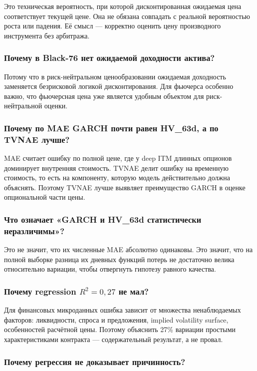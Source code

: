 \documentclass[11pt,a4paper]{article}
\begin{document}
Это техническая вероятность, при которой дисконтированная ожидаемая цена соответствует текущей цене. Она не обязана совпадать с реальной вероятностью роста или падения. Её смысл --- корректно оценить цену производного инструмента без арбитража.

\subsubsection{Почему в Black-76 нет ожидаемой доходности актива?}

Потому что в риск-нейтральном ценообразовании ожидаемая доходность заменяется безрисковой логикой дисконтирования. Для фьючерса особенно важно, что фьючерсная цена уже является удобным объектом для риск-нейтральной оценки.

\subsubsection{Почему по MAE GARCH почти равен HV\_63d, а по TVNAE лучше?}

MAE считает ошибку по полной цене, где у deep ITM длинных опционов доминирует внутренняя стоимость. TVNAE делит ошибку на временную стоимость, то есть на компоненту, которую модель действительно должна объяснять. Поэтому TVNAE лучше выявляет преимущество GARCH в оценке опциональной части цены.

\subsubsection{Что означает «GARCH и HV\_63d статистически неразличимы»?}

Это не значит, что их численные MAE абсолютно одинаковы. Это значит, что на полной выборке разница их дневных функций потерь не достаточно велика относительно вариации, чтобы отвергнуть гипотезу равного качества.

\subsubsection{Почему regression $R^2=0{,}27$ не мал?}

Для финансовых микроданных ошибка зависит от множества ненаблюдаемых факторов: ликвидности, спроса и предложения, implied volatility surface, особенностей расчётной цены. Поэтому объяснить 27\% вариации простыми характеристиками контракта --- содержательный результат, а не провал.

\subsubsection{Почему регрессия не доказывает причинность?}
\end{document}
